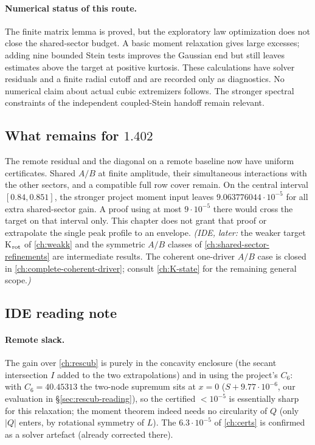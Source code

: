 \paragraph{Numerical status of this route.}
The finite matrix lemma is proved, but the exploratory law optimization
does not close the shared-sector budget. A basic moment relaxation gives
large excesses; adding nine bounded Stein tests improves the Gaussian end
but still leaves estimates above the target at positive kurtosis.
These calculations have solver residuals and a finite radial cutoff and
are recorded only as diagnostics. No numerical claim about actual cubic
extremizers follows. The stronger spectral constraints of the independent
coupled-Stein handoff remain relevant.

\subsection{What remains for $1.402$}
The remote residual and the diagonal on a remote baseline now have uniform
certificates. Shared $A/B$ at finite amplitude, their simultaneous
interactions with the other sectors, and a compatible full row cover remain.
On the central interval $[0.84,0.851]$, the stronger project moment input
leaves $9.063776044\cdot10^{-5}$ for all extra shared-sector gain. A proof
using at most $9\cdot10^{-5}$ there would cross the target on that interval
only. This chapter does not grant that proof or extrapolate the single
peak profile to an envelope.
\emph{(IDE, later:} the weaker target K$_{\rm rot}$ of \autoref{ch:weakk} and the symmetric $A/B$ classes of
\autoref{ch:shared-sector-refinements} are intermediate results. The coherent one-driver $A/B$ case is closed in \autoref{ch:complete-coherent-driver}; consult \autoref{ch:K-state} for the remaining general scope.\emph{)}

\subsection{IDE reading note}\label{sec:remotediag-reading}
\paragraph{Remote slack.} The gain over \autoref{ch:rescub} is purely in the concavity enclosure (the secant intersection $I$ added to the two extrapolations) and in using the project's
$C_6$: with $C_6=40.45313$ the two-node supremum sits at $x=0$ ($S+9.77\cdot10^{-6}$, our evaluation in \S\ref{sec:rescub-reading}), so the certified $<10^{-5}$ is essentially sharp for this
relaxation; the moment theorem indeed needs no circularity of $Q$ (only $|Q|$ enters, by rotational symmetry of $L$). The $6.3\cdot10^{-5}$ of \autoref{ch:certs} is confirmed as a solver
artefact (already corrected there).
